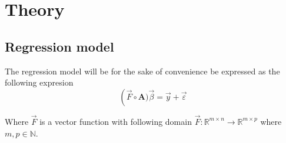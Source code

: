 \section{Theory}\label{sec:theory}

\subsection{Regression model}

The regression model will be for the sake of convenience be expressed as the following expresion
$$
\left(\vec{F}\circ \mathbf{A})\vec{\beta}=\vec{y}+\vec{\varepsilon}
$$

Where $\vec{F}$ is a vector function with following domain $\vec{F}:\mathbb{R}^{m\times n}\to \mathbb{R}^{m\times p}$ where $m,p\in \mathbb{N}$.